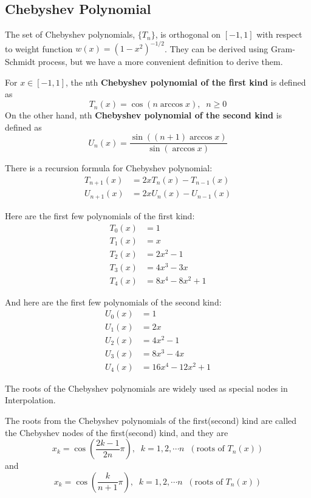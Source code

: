 \subsection{Chebyshev Polynomial}
The set of Chebyshev polynomials, $\{ T_n \}$, is orthogonal on $[-1,1]$ with respect to weight function $w(x) = (1-x^2)^{-1/2}$. They can be derived using Gram-Schmidt process, but we have a more convenient definition to derive them.

\begin{definition}
	For $x\in[-1,1]$, the nth \textbf{Chebyshev polynomial of the first kind} is defined as
	\[ T_n(x) = \cos(n\arccos x),\;\;n\geq 0 \]
	On the other hand, nth \textbf{Chebyshev polynomial of the second kind} is defined as
	\[ U_n(x) = \frac{\sin((n+1)\arccos x)}{\sin(\arccos x)} \]
\end{definition}

\begin{thm}
	There is a recursion formula for Chebyshev polynomial:
	\begin{align*}
	T_{n+1}(x) &= 2xT_n(x) - T_{n-1}(x)\\
	U_{n+1}(x) &= 2xU_n(x) - U_{n-1}(x)
	\end{align*}
\end{thm}

Here are the first few polynomials of the first kind:
\begin{align*}
T_0(x) &= 1\\
T_1(x) &= x\\
T_2(x) &= 2x^2 -1\\
T_3(x) &= 4x^3 -3x\\
T_4(x) &= 8x^4 -8x^2 + 1
\end{align*}

And here are the first few polynomials of the second kind:
\begin{align*}
U_0(x) &= 1\\
U_1(x) &= 2x\\
U_2(x) &= 4x^2 - 1\\
U_3(x) &= 8x^3 - 4x\\
U_4(x) &= 16x^4 - 12x^2 + 1
\end{align*}

\begin{property}
	The roots of the Chebyshev polynomials are widely used as special nodes in Interpolation.
	
	The roots from the Chebyshev polynomials of the first(second) kind are called the Chebyshev nodes of the first(second) kind, and they are
	\[ x_k = \cos\left( \frac{2k-1}{2n}\pi \right),\;\; k=1,2,\cdots n \;\;(\text{roots of $T_n(x)$}) \]
	and
	\[ x_k = \cos\left( \frac{k}{n+1}\pi \right),\;\; k=1,2,\cdots n\;\; (\text{roots of $T_n(x)$}) \]
\end{property}